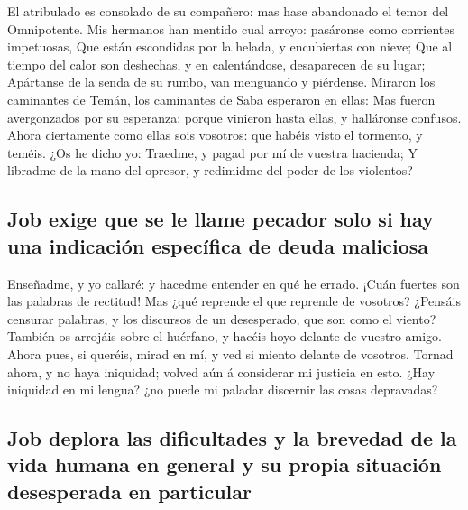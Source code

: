  El atribulado es consolado de su compañero: mas hase
abandonado el temor del Omnipotente.  Mis hermanos han
mentido cual arroyo: pasáronse como corrientes impetuosas,
 Que están escondidas por la helada, y encubiertas con
nieve;  Que al tiempo del calor son deshechas, y en
calentándose, desaparecen de su lugar;  Apártanse de la
senda de su rumbo, van menguando y piérdense.  Miraron
los caminantes de Temán, los caminantes de Saba esperaron en ellas:
 Mas fueron avergonzados por su esperanza; porque
vinieron hasta ellas, y halláronse confusos.  Ahora
ciertamente como ellas sois vosotros: que habéis visto el tormento, y
teméis.  ¿Os he dicho yo: Traedme, y pagad por mí de
vuestra hacienda;  Y libradme de la mano del opresor, y
redimidme del poder de los violentos?

\hypertarget{job-exige-que-se-le-llame-pecador-solo-si-hay-una-indicaciuxf3n-especuxedfica-de-deuda-maliciosa}{%
\subsection{Job exige que se le llame pecador solo si hay una indicación
específica de deuda
maliciosa}\label{job-exige-que-se-le-llame-pecador-solo-si-hay-una-indicaciuxf3n-especuxedfica-de-deuda-maliciosa}}

 Enseñadme, y yo callaré: y hacedme entender en qué he
errado.  ¡Cuán fuertes son las palabras de rectitud! Mas
¿qué reprende el que reprende de vosotros?  ¿Pensáis
censurar palabras, y los discursos de un desesperado, que son como el
viento?  También os arrojáis sobre el huérfano, y hacéis
hoyo delante de vuestro amigo.  Ahora pues, si queréis,
mirad en mí, y ved si miento delante de vosotros.  Tornad
ahora, y no haya iniquidad; volved aún á considerar mi justicia en esto.
 ¿Hay iniquidad en mi lengua? ¿no puede mi paladar
discernir las cosas depravadas?

\hypertarget{job-deplora-las-dificultades-y-la-brevedad-de-la-vida-humana-en-general-y-su-propia-situaciuxf3n-desesperada-en-particular}{%
\subsection{Job deplora las dificultades y la brevedad de la vida humana
en general y su propia situación desesperada en
particular}\label{job-deplora-las-dificultades-y-la-brevedad-de-la-vida-humana-en-general-y-su-propia-situaciuxf3n-desesperada-en-particular}}

